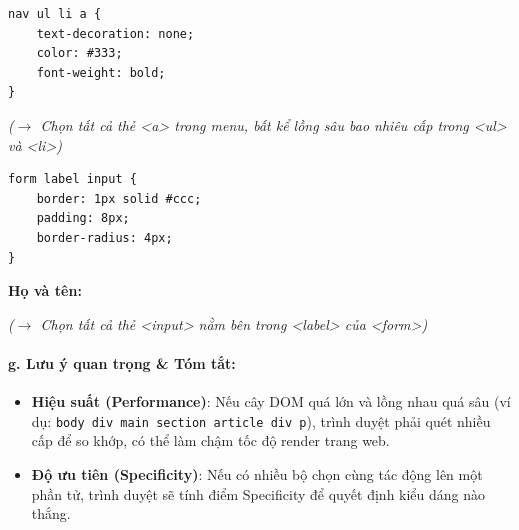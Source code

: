 \documentclass[11pt,oneside]{book}
\newcommand{\codeinline}[1]{\textcolor{accentOrange}{\texttt{#1}}}
\begin{document}
\begin{codeWindow}
\begin{lstlisting}[language=CSS3]
nav ul li a {
    text-decoration: none;
    color: #333;
    font-weight: bold;
}
\end{lstlisting}
\end{codeWindow}

\begin{browserWindow}
\sffamily\small
\tcbox[on line, arc=3pt, colback=gray!15, colframe=gray!40, boxrule=1pt, boxsep=4pt, left=8pt, right=8pt]{\textcolor{darkText}{\bfseries Trang chủ}} \quad
\tcbox[on line, arc=3pt, colback=gray!15, colframe=gray!40, boxrule=1pt, boxsep=4pt, left=8pt, right=8pt]{\textcolor{darkText}{\bfseries Khóa học $\downarrow$}} \par\vspace{4pt}
\textcolor{gray!70}{\small\textit{($\rightarrow$ Chọn tất cả thẻ <a> trong menu, bất kể lồng sâu bao nhiêu cấp trong <ul> và <li>)}}
\end{browserWindow}

\begin{codeWindow}
\begin{lstlisting}[language=CSS3]
form label input {
    border: 1px solid #ccc;
    padding: 8px;
    border-radius: 4px;
}
\end{lstlisting}
\end{codeWindow}

\begin{browserWindow}
\sffamily\small
\textbf{Họ và tên:} \tcbox[on line, arc=3pt, colback=white, colframe=gray!40, boxrule=1pt, boxsep=3pt, left=8pt, right=20pt]{\textcolor{gray!60}{Nhập họ tên...}} \par\vspace{4pt}
\textcolor{gray!70}{\small\textit{($\rightarrow$ Chọn tất cả thẻ <input> nằm bên trong <label> của <form>)}}
\end{browserWindow}

\paragraph{g. Lưu ý quan trọng \& Tóm tắt:}

\begin{warnBox}
\begin{itemize}[leftmargin=1.5em, itemsep=3pt, parsep=0pt]
    \item \textbf{Hiệu suất (Performance)}: Nếu cây DOM quá lớn và lồng nhau quá sâu (ví dụ: \codeinline{body div main section article div p}), trình duyệt phải quét nhiều cấp để so khớp, có thể làm chậm tốc độ render trang web.
    \item \textbf{Độ ưu tiên (Specificity)}: Nếu có nhiều bộ chọn cùng tác động lên một phần tử, trình duyệt sẽ tính điểm Specificity để quyết định kiểu dáng nào thắng.
\end{itemize}
\end{warnBox}
\end{document}
